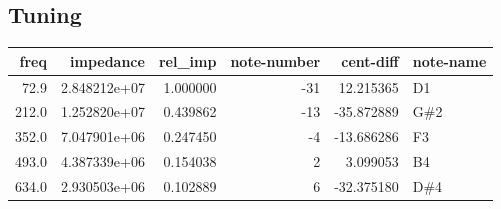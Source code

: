 \documentclass{article}
\begin{document}
\subsection{Tuning}
\begin{centering}
\begin{tabular}{rrrrrl}
\toprule
 freq &    impedance &  rel\_imp &  note-number &  cent-diff & note-name \\
\midrule
 72.9 & 2.848212e+07 & 1.000000 &          -31 &  12.215365 &        D1 \\
212.0 & 1.252820e+07 & 0.439862 &          -13 & -35.872889 &       G\#2 \\
352.0 & 7.047901e+06 & 0.247450 &           -4 & -13.686286 &        F3 \\
493.0 & 4.387339e+06 & 0.154038 &            2 &   3.099053 &        B4 \\
634.0 & 2.930503e+06 & 0.102889 &            6 & -32.375180 &       D\#4 \\
\bottomrule
\end{tabular}
\end{centering}
\end{document}
